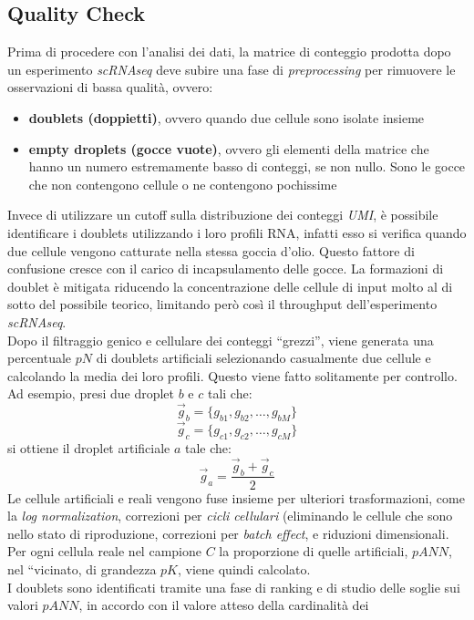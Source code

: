 \documentclass[a4paper,12pt, oneside]{book}
\begin{document}
\subsection{Quality Check}
Prima di procedere con l'analisi dei dati, la matrice di conteggio prodotta dopo
un esperimento \textit{scRNAseq} deve subire una fase di \textit{preprocessing}
per rimuovere le osservazioni di bassa qualità, ovvero:
\begin{itemize}
  \item \textbf{doublets (doppietti)}, ovvero quando due cellule sono isolate
  insieme 
  \item \textbf{empty droplets (gocce vuote)}, ovvero gli elementi della matrice
  che hanno un 
  numero estremamente basso di conteggi, se non nullo. Sono le gocce che non
  contengono cellule o ne contengono pochissime
\end{itemize}
Invece di utilizzare un cutoff sulla distribuzione dei conteggi \textit{UMI}, è
possibile 
identificare i doublets utilizzando i loro profili RNA, infatti esso si
verifica quando due cellule vengono catturate nella stessa goccia d'olio. Questo
fattore di confusione cresce con il carico di incapsulamento delle gocce. La
formazioni di doublet è mitigata riducendo la concentrazione delle cellule di
input molto al di sotto del possibile teorico, limitando però così il throughput
dell'esperimento \textit{scRNAseq}.\\
Dopo il filtraggio genico e cellulare dei conteggi ``grezzi'', viene generata
una percentuale $pN$ di doublets artificiali selezionando casualmente due
cellule e calcolando la media dei loro profili. Questo viene fatto solitamente
per controllo. Ad esempio, presi due droplet
$b$ e $c$ tali che:
\[\vec{g}_b=\{g_{b1},g_{b2},\ldots,g_{bM}\}\]
\[\vec{g}_c=\{g_{c1},g_{c2},\ldots,g_{cM}\}\]
si ottiene il droplet artificiale $a$ tale che:
\[\vec{g}_a=\frac{\vec{g}_b+\vec{g}_c}{2}\]
Le cellule artificiali e reali vengono fuse insieme per ulteriori
trasformazioni, come la \textit{log normalization}, correzioni per
\textit{cicli cellulari} (eliminando le cellule che sono nello stato di
riproduzione, correzioni per \textit{batch effect}, e riduzioni dimensionali.\\
Per ogni cellula reale nel campione $C$ la proporzione di quelle artificiali,
$pANN$, nel ``vicinato, di grandezza $pK$, viene quindi calcolato.\\
I doublets sono identificati tramite una fase di ranking e di studio delle
soglie sui valori $pANN$, in accordo con il valore atteso della cardinalità dei
\end{document}
